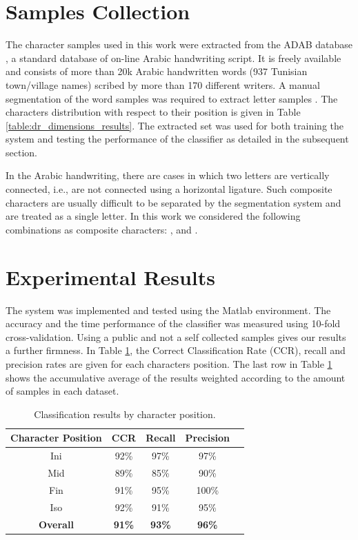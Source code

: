 \documentclass[10pt, conference, compsocconf]{IEEEtran}
\begin{document}
\section{Samples Collection}
\label{sec:samples_collection}
The character samples used in this work were extracted from the ADAB database \cite{el2009icdar}, a standard database of on-line Arabic handwriting script. 
It is freely available and consists of more than 20k Arabic handwritten words (937 Tunisian town/village names) scribed by more than 170 different writers. 
A manual segmentation of the word samples was required to extract letter samples \cite{kour2014real}.
The characters distribution with respect to their position is given in Table \ref{table:dr_dimensions_results}.
The extracted set was used for both training the system and testing the performance of the classifier as detailed in the subsequent section.

In the Arabic handwriting, there are cases in which two letters are vertically connected, i.e., are not connected using a horizontal ligature.  
Such composite characters are usually difficult to be separated by the segmentation system and are treated as a single letter.
In this work we considered the following combinations as composite characters:  ,  and .

\section{Experimental Results}
\label{sec:experimental_results}

The system was implemented and tested using the Matlab environment.
The accuracy and the time performance of the classifier was measured using 10-fold cross-validation.
Using a public and not a self collected samples gives our results a further firmness.
In Table \ref{table:results_position}, the Correct Classification Rate (CCR), recall and precision rates are given for each characters position.
The last row in Table \ref{table:results_position} shows the accumulative average of the results weighted according to the amount of samples in each dataset.

\begin{table}
\centering
\renewcommand{\arraystretch}{1.2}
\begin{tabular}{ | c | c | c | c | c |}
\hline
	\textbf{Character Position} & \textbf{CCR} & \textbf{Recall} &  \textbf{Precision} \\
	\hline 
	Ini & 92\% & 97\% & 97\% \\                
  	\hline
  	Mid & 89\% & 85\% & 90\% \\
  	\hline
  	Fin & 91\% &  95\% & 100\% \\
  	\hline
  	Iso & 92\% &  91\% & 95\% \\
  	\hline
  	\textbf{Overall} & \textbf{91\%} &  \textbf{93\%} & \textbf{96\%} \\
  	\hline
\end{tabular}
\caption{Classification results by character position.}
\label{table:results_position} 
\end{table}
\end{document}
